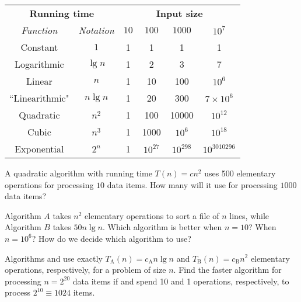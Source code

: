 \begin{center}
   \begin{tabular}{|c|c|cccc|} \hline 
   \multicolumn{2}{|c|}{\textbf{Running time}} &  
   \multicolumn{4}{c|}{\textbf{Input size}} 
\\ \cline{1-6} 
   \emph{Function}     & \emph{Notation} & $10$ & $100$ & $1000$ & $10^7$
\\ \hline 
   Constant     & $1$      & 1  & 1  &   1 &   1 \\ \hline 
   Logarithmic  & $\lg n$ & 1  & 2& 3 & 7  \\ \hline 
   Linear       & $n$ & 1 & 10 & 100 & $10^6$   \\ \hline 
``Linearithmic" & $n  \lg n$ & 1 & 20 & 300 & $7\times 10^6$ \\ \hline 
   Quadratic    & $n^{2}$ & 1 & 100 & 10000 & $10^{12}$ \\ \hline 
   Cubic        & $n^{3}$ & 1 & 1000 & $10^6$ &  $10^{18}$ \\ \hline 
   Exponential  & $2^{n}$ & 1 & $10^{27}$ & $10^{298} $ & $10^{3010296}$  \\ \hline 
   \end{tabular}
\end{center}
 

\begin{Boxample}[4]
\label{exr:time-compl:2}
A quadratic algorithm with running time \(T(n)=cn^2 \)
uses 500 elementary operations for processing $10$ data items. How many will it 
use for processing $1000$ data items? 
\end{Boxample}

\begin{Boxample}[4]
Algorithm $A$ takes $n^2$ elementary operations to sort a file of $n$ lines, while Algorithm $B$ takes $50n\lg n$. 
Which algorithm is better when $n = 10$? When $n=10^6$? How do we decide which algorithm to use?
\end{Boxample}

\begin{Boxample}[4]
\label{exr:time-compl:7A}
Algorithms  and  use exactly $T_\mathrm{A}(n) = c_\mathrm{A} n \lg n$
and $T_\mathrm{B}(n) = c_\mathrm{B} n^{2}$ elementary operations, respectively, for a problem of size $n$.
Find the faster algorithm for processing $n = 2^{20}$ data items if
 and  spend 10 and 1 operations, respectively, to process $2^{10} \equiv 1024$ items.
\end{Boxample}


